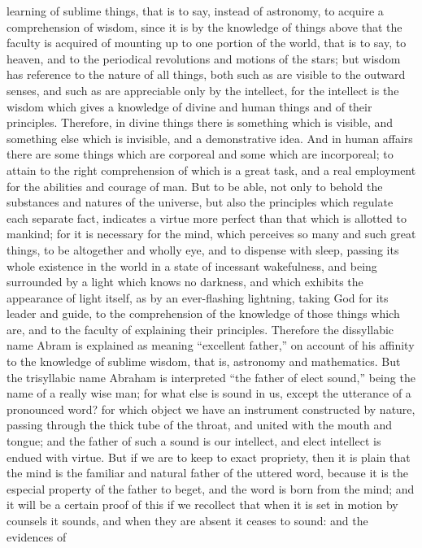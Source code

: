 learning of sublime things, that is to say, instead of astronomy, to acquire a comprehension of
wisdom, since it is by the knowledge of things above that the faculty is acquired of mounting up to
one portion of the world, that is to say, to heaven, and to the periodical revolutions and motions of
the stars; but wisdom has reference to the nature of all things, both such as are visible to the
outward senses, and such as are appreciable only by the intellect, for the intellect is the wisdom
which gives a knowledge of divine and human things and of their principles. Therefore, in divine
things there is something which is visible, and something else which is invisible, and a
demonstrative idea. And in human affairs there are some things which are corporeal and some
which are incorporeal; to attain to the right comprehension of which is a great task, and a real
employment for the abilities and courage of man. But to be able, not only to behold the substances
and natures of the universe, but also the principles which regulate each separate fact, indicates a
virtue more perfect than that which is allotted to mankind; for it is necessary for the mind, which
perceives so many and such great things, to be altogether and wholly eye, and to dispense with
sleep, passing its whole existence in the world in a state of incessant wakefulness, and being
surrounded by a light which knows no darkness, and which exhibits the appearance of light itself,
as by an ever-flashing lightning, taking God for its leader and guide, to the comprehension of the
knowledge of those things which are, and to the faculty of explaining their principles. Therefore the
dissyllabic name Abram is explained as meaning ``excellent father,'' on account of his affinity to the
knowledge of sublime wisdom, that is, astronomy and mathematics. But the trisyllabic name
Abraham is interpreted ``the father of elect sound,'' being the name of a really wise man; for what
else is sound in us, except the utterance of a pronounced word? for which object we have an
instrument constructed by nature, passing through the thick tube of the throat, and united with the
mouth and tongue; and the father of such a sound is our intellect, and elect intellect is endued with
virtue. But if we are to keep to exact propriety, then it is plain that the mind is the familiar and
natural father of the uttered word, because it is the especial property of the father to beget, and the
word is born from the mind; and it will be a certain proof of this if we recollect that when it is set in
motion by counsels it sounds, and when they are absent it ceases to sound: and the evidences of

